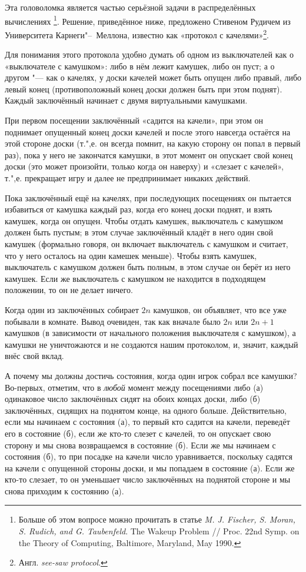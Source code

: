 \documentclass[twoside]{book}
\begin{document}
Эта головоломка является частью серьёзной задачи в распределённых вычислениях%
\footnote{Больше об этом вопросе можно прочитать в статье \emph{M. J. Fischer, S. Moran, S. Rudich, and G. Taubenfeld}. The Wakeup Problem /\!/ {Proc. 22nd Symp. on the Theory of Computing}, Baltimore, Maryland, May 1990.}.
Решение, приведённое ниже, предложено Стивеном Рудичем из Университета Карнеги"--~Меллона, известно как «протокол с качелями»\footnote{Англ. \emph{see-saw protocol}.}.

\medskip

Для понимания этого протокола удобно думать об одном из выключателей как о «выключателе с камушком»: либо в нём лежит камушек, либо он пуст; а о другом "--- как о качелях, у доски качелей может быть опущен либо правый, либо  левый конец (противоположный конец доски должен быть при этом поднят).
Каждый заключённый начинает с двумя виртуальными камушками.

При первом посещении заключённый «садится на качели», при этом он поднимает опущенный конец доски качелей и
после этого навсегда остаётся на этой стороне доски (т.",е. он всегда помнит, на какую сторону он попал в первый раз), пока у него не закончатся камушки, в этот момент он опускает свой конец доски (это может произойти, только когда он наверху) и «слезает с качелей», т.",е. прекращает игру и далее не предпринимает никаких действий.

Пока заключённый ещё на качелях,
при последующих посещениях он пытается избавиться от камушка каждый раз, когда его конец доски поднят,
и взять камушек, когда он опущен.
Чтобы  отдать камушек, выключатель с камушком должен быть пустым;
в этом случае заключённый 
кладёт в него один свой камушек (формально говоря, он включает выключатель с камушком и считает, что у него осталось на один камешек меньше).
Чтобы  взять камушек, выключатель с камушком должен быть полным, в этом случае он берёт из него камушек.
Если же выключатель с камушком не находится в подходящем положении, то он не делает ничего.

Когда один из заключённых собирает $2n$ камушков, он объявляет, что все уже побывали в комнате.
Вывод очевиден, так как вначале было $2n$ или $2n+1$ камушков (в зависимости от начального положения выключателя с камушком), а камушки не уничтожаются и не создаются нашим протоколом, и, значит, каждый внёс свой вклад.

А почему мы должны достичь состояния, когда один игрок собрал все камушки?
Во-первых, отметим, что в \emph{любой} момент между посещениями либо 
(а) одинаковое число заключённых сидят на обоих концах доски, либо 
(б) заключённых, сидящих на поднятом конце, на одного больше.
Действительно, если мы начинаем с состояния (а), то первый кто садится на качели, переведёт его в состояние (б), если же кто-то слезет с качелей, то он опускает свою сторону и мы  снова возвращаемся в состояние (б).
Если же мы начинаем с состояния (б), то при посадке на качели число уравнивается, поскольку садятся на качели с опущенной стороны доски, и мы попадаем в состояние (а).
Если же кто-то слезает, то он уменьшает число заключённых на поднятой стороне и мы снова приходим к состоянию (а).
\end{document}
